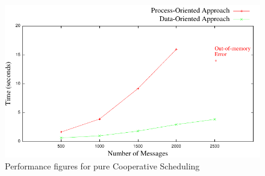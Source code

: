 %	
%	
%
%
%		
%		
\begin{figure}
	\centering
	\includegraphics[scale=.68]{jaj8.pdf}
	\caption{Performance figures for pure Cooperative Scheduling}
	\label{jj}
\end{figure}

